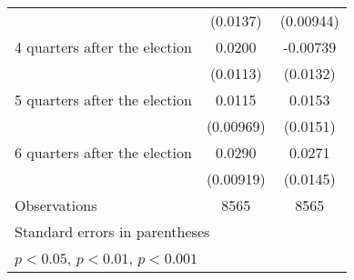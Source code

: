 \begin{table}[htbp]
\begin{tabular}{l*{2}{c}}
                    &    (0.0137)         &   (0.00944)         \\
[1em]
 4 quarters after the election&      0.0200         &    -0.00739         \\
                    &    (0.0113)         &    (0.0132)         \\
[1em]
 5 quarters after the election&      0.0115         &      0.0153         \\
                    &   (0.00969)         &    (0.0151)         \\
[1em]
 6 quarters after the election&      0.0290\sym{**} &      0.0271         \\
                    &   (0.00919)         &    (0.0145)         \\
\hline
Observations        &        8565         &        8565         \\
\hline\hline
\multicolumn{3}{l}{\footnotesize Standard errors in parentheses}\\
\multicolumn{3}{l}{\footnotesize \sym{*} \(p<0.05\), \sym{**} \(p<0.01\), \sym{***} \(p<0.001\)}\\
\end{tabular}
\end{table}

